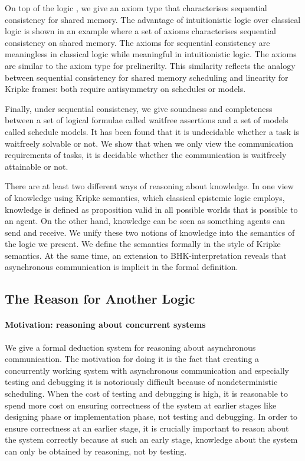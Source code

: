   On top of the logic \iec, we give an axiom type that characterises
  sequential consistency for shared memory.
  The advantage of intuitionistic logic over classical logic is shown
  in an example where a set of axioms characterises
  sequential consistency on shared memory.
  The axioms for sequential consistency are
  meaningless in classical logic while
  meaningful in intuitionistic logic.
  The axioms are similar to
  the axiom type for prelinerilty.
  This similarity reflects the analogy
  between sequential consistency for shared memory scheduling
  and linearity for Kripke frames: both require antisymmetry on schedules or models.

  Finally, under sequential consistency, we give soundness and completeness between
  a set of logical formulae called waitfree assertions and a set of models called
  schedule models.
  It has been found that it is undecidable whether a task is waitfreely solvable or not.
  We show that when we only view the communication requirements of tasks,
  it is decidable whether the communication is waitfreely attainable or not.

  There are at least two different ways of reasoning about knowledge.
  In one view of knowledge using Kripke semantics,
  which classical epistemic logic employs,
  knowledge is defined as proposition valid in all possible worlds
  that is possible to an agent.
  On the other hand, knowledge can be seen as something agents can send and receive.
  We unify these two notions of knowledge into the semantics of the logic we present.
  We define the semantics formally in the style of Kripke semantics.
  At the same time,
  an extension to BHK-interpretation reveals that asynchronous
  communication is implicit in the formal definition.

  \subsection{The Reason for Another Logic}

    \paragraph{Motivation: reasoning about concurrent systems}
    We give a formal deduction system for reasoning about
    asynchronous communication.
    The motivation for doing it is
    the fact that creating a concurrently
    working system with asynchronous communication
    and especially testing and debugging it is
    notoriously difficult
    because of nondeterministic scheduling.
    When the cost of testing and debugging is high,
    it is reasonable to
    spend more cost on ensuring correctness of the system
    at earlier stages like designing phase or implementation phase, not testing and debugging.
    In order to ensure correctness at an earlier stage,
    it is crucially important to reason about the system correctly because
    at such an early stage, knowledge about the system can only be obtained by reasoning,
    not by testing.

